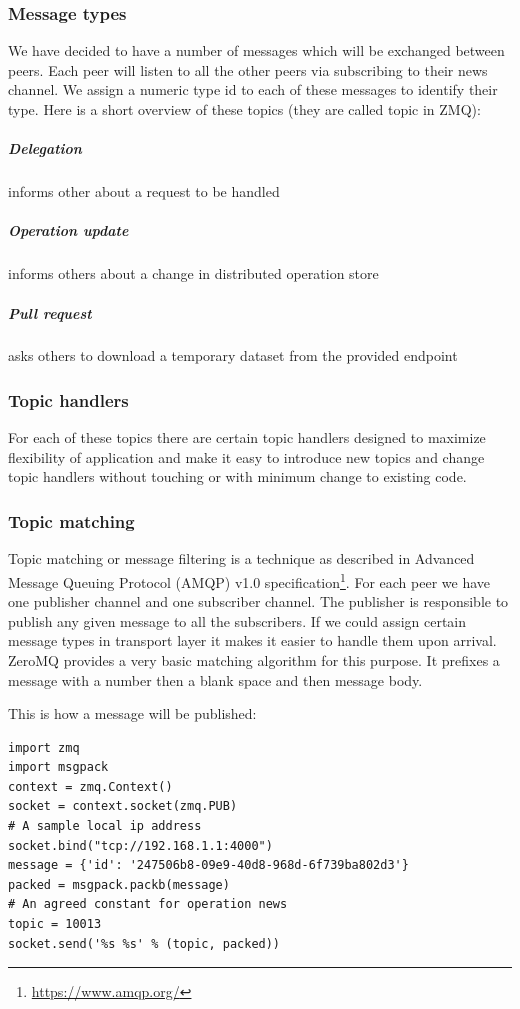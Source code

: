 \subsubsection{Message types}
We have decided to have a number of messages which will be exchanged between peers.
Each peer will listen to all the other peers via subscribing to their news channel.
We assign a numeric type id to each of these messages to identify their type. 
Here is a short overview of these topics (they are called topic in ZMQ):

\subparagraph{Delegation} informs other about a request to be handled
\subparagraph{Operation update} informs others about a change in distributed operation store
\subparagraph{Pull request} asks others to download a temporary dataset from the provided endpoint

\subsubsection{Topic  handlers}
For each of these topics there are certain topic handlers designed to maximize flexibility of application and
make it easy to introduce new topics and change topic handlers without touching or with minimum change to existing code.

\subsubsection{Topic matching}
Topic matching or message filtering is a technique as described 
in Advanced Message Queuing Protocol (AMQP) v1.0 specification\footnote{\url{https://www.amqp.org/}}.
For each peer we have one publisher channel and one subscriber channel. 
The publisher is responsible to publish any given message to all the subscribers.
If we could assign certain message types in transport layer it makes it easier
to handle them upon arrival. 
ZeroMQ provides a very basic matching algorithm for this purpose.
It prefixes a message with a number then a blank space and then message body. 

This is how a message will be published:
\begin{lstlisting}[caption={Publisher sends packed messages}]
import zmq
import msgpack
context = zmq.Context()
socket = context.socket(zmq.PUB)
# A sample local ip address
socket.bind("tcp://192.168.1.1:4000") 
message = {'id': '247506b8-09e9-40d8-968d-6f739ba802d3'}
packed = msgpack.packb(message)
# An agreed constant for operation news
topic = 10013
socket.send('%s %s' % (topic, packed))
\end{lstlisting}

